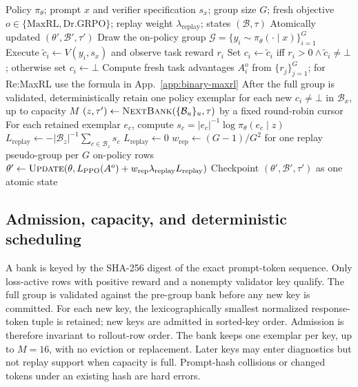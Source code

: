 \documentclass{article}
\newcommand{\1}{\mathbf 1}
\theoremstyle{remark}
\theoremstyle{definition}
\theoremstyle{plain}
\begin{document}
\begin{algorithm}[H]
  \caption{One Re:MaxRL optimizer update}
  \label{alg:verified-replay-update}
  \small
  \begin{algorithmic}[1]
    \REQUIRE Policy $\pi_\theta$; prompt $x$ and verifier specification
      $s_x$; group size $G$; fresh objective $o\in\{\mathrm{MaxRL},\mathrm{Dr.GRPO}\}$; replay weight $\lambda_{\mathrm{replay}}$;
      states $(\mathcal B,\tau)$
    \ENSURE Atomically updated $(\theta',\mathcal B',\tau')$
    \STATE Draw the on-policy group
      $\mathcal G=\{y_i\sim\pi_\theta(\cdot\mid x)\}_{i=1}^G$
      \STATE Execute $\widetilde c_i\gets V(y_i,s_x)$ and observe task
        reward $r_i$
      \STATE Set $c_i\gets\widetilde c_i$ iff
        $r_i>0\wedge\widetilde c_i\ne\bot$; otherwise set $c_i\gets\bot$
    \ENDFOR
    \STATE Compute fresh task advantages $A_i^{o}$ from $\{r_j\}_{j=1}^G$; for Re:MaxRL use the formula in App.~\ref{app:binary-maxrl}
    \STATE After the full group is validated, deterministically retain one
      policy exemplar for each new $c_i\ne\bot$ in $\mathcal B_x$, up to
      capacity $M$
    \STATE $(z,\tau')\gets\textsc{NextBank}
      (\{\mathcal B_u\}_u,\tau)$ by a fixed round-robin cursor
      \STATE For each retained exemplar $e_c$, compute
        $s_c=|e_c|^{-1}\log\pi_\theta(e_c\mid z)$
      \STATE $L_{\mathrm{replay}}\gets-|\mathcal B_z|^{-1}
        \sum_{c\in\mathcal B_z}s_c$
    \ELSE
      \STATE $L_{\mathrm{replay}}\gets0$
    \ENDIF
    \STATE $w_{\mathrm{rep}}\gets(G-1)/G^2$ for one replay
      pseudo-group per $G$ on-policy rows
    \STATE $\theta'\gets\textsc{Update}
      (\theta,L_{\mathrm{PPO}}(A^{o})
      +w_{\mathrm{rep}}\lambda_{\mathrm{replay}}L_{\mathrm{replay}})$
    \STATE Checkpoint $(\theta',\mathcal B',\tau')$ as one atomic state
\end{algorithmic}
\end{algorithm}

\subsection{Admission, capacity, and deterministic scheduling}
\label{app:algorithm-bank}

A bank is keyed by the SHA-256 digest of the exact prompt-token sequence.
Only loss-active rows with positive reward and a nonempty validator key
qualify. The full group is validated against the pre-group bank before
any new key is committed. For each new key, the lexicographically smallest
normalized response-token tuple is retained; new keys are admitted in
sorted-key order. Admission is therefore invariant to rollout-row order.
The bank keeps one exemplar per key, up to $M=16$, with no eviction or
replacement. Later keys may enter diagnostics but not replay support when
capacity is full. Prompt-hash collisions or changed tokens under an
existing hash are hard errors.
\end{document}
